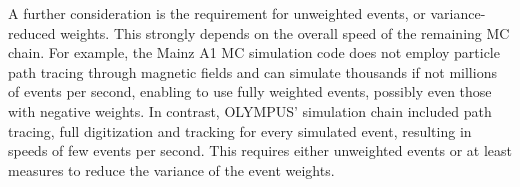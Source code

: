 A further consideration is the requirement for unweighted events, or variance-reduced weights. This strongly depends on the overall speed of the remaining MC chain. For example, the Mainz A1 MC simulation code does not employ particle path tracing through magnetic fields and can simulate thousands if not millions of events per second, enabling to use fully weighted events, possibly even those with negative weights. In contrast, OLYMPUS' simulation chain included path tracing, full digitization and tracking for every simulated event, resulting in speeds of few events per second. This requires either unweighted events or at least measures to reduce the variance of the event weights. 






